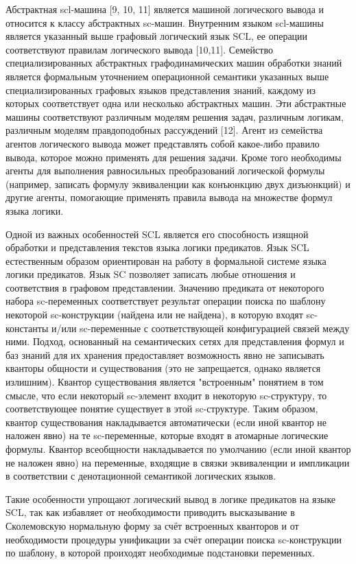 Абстрактная scl-машина [9, 10, 11] является машиной логического вывода и относится к классу абстрактных sc-машин. Внутренним языком scl-машины является указанный выше графовый логический язык SCL, ее операции соответствуют правилам логического вывода [10,11]. Семейство специализированных абстрактных графодинамических машин обработки знаний является формальным уточнением операционной семантики указанных выше специализированных графовых языков представления знаний, каждому из которых соответствует одна или несколько абстрактных машин. Эти абстрактные машины соответствуют различным моделям решения задач, различным логикам, различным моделям правдоподобных рассуждений [12]. 
Агент из семейства агентов логического вывода может представлять собой какое-либо правило вывода, которое можно применять для решения задачи. Кроме того необходимы агенты для выполнения равносильных преобразований логической формулы (например, записать формулу эквиваленции как конъюнкцию двух дизъюнкций) и другие агенты, помогающие применять правила вывода на множестве формул языка логики.

Одной из важных особенностей SCL является его способность изящной обработки и представления текстов языка логики предикатов. Язык SCL естественным образом ориентирован на работу в формальной системе языка логики предикатов. Язык SC позволяет записать любые отношения и соответствия в графовом представлении. Значению предиката от некоторого набора sc-переменных соответствует результат операции поиска по шаблону некоторой sc-конструкции (найдена или не найдена), в которую входят sc-константы и/или sc-переменные с соответствующей конфигурацией связей между ними. Подход, основанный на семантических сетях для представления формул и баз знаний для их хранения предоставляет возможность явно не записывать кванторы общности и существования (это не запрещается, однако является излишним). Квантор существования является "встроенным" понятием в том смысле, что если некоторый sc-элемент входит в некоторую sc-структуру, то соответствующее понятие существует в этой sc-структуре. Таким образом, квантор существования накладывается автоматически (если иной квантор не наложен явно) на те sc-переменные, которые входят в атомарные логические формулы. Квантор всеобщности накладывается по умолчанию (если иной квантор не наложен явно) на переменные, входящие в связки эквиваленции и импликации в соответствии с денотационной семантикой логических языков.

Такие особенности упрощают логический вывод в логике предикатов на языке SCL, так как избавляет от необходимости приводить высказывание в Сколемовскую нормальную форму за счёт встроенных кванторов и от необходимости процедуры унификации за счёт операции поиска sc-конструкции по шаблону, в которой проиходят необходимые подстановки переменных.

